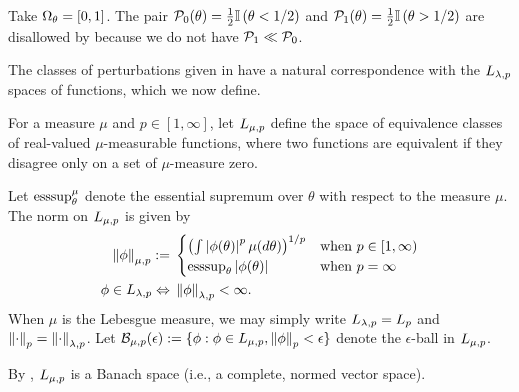 \begin{ex}
%
Take $\Omega_{\theta} = [0,1]$.  The pair $\mathcal{P}_{0}(\theta)  = \frac{1}{2}\mathbb{I}\left(\theta < 1/2\right)$
and $\mathcal{P}_{1}(\theta) = \frac{1}{2} \mathbb{I}\left(\theta > 1/2\right)$ are disallowed
by  because we do not have $\mathcal{P}_{1} \ll \mathcal{P}_{0}$.
%
\end{ex}


The classes of perturbations given in  have a natural
correspondence with the ${L_{\lambda, p}}$ spaces of functions, which we now
define.


\begin{defn}
\citep[Sections 5.1-5.2]{dudley:2018:real}
%
For a measure $\mu$ and $p \in [1, \infty]$, let ${L_{\mu,p}}$ define the
space of equivalence classes of real-valued $\mu$-measurable functions,
where two functions are equivalent if they disagree only on a set of
$\mu$-measure zero.

Let $\operatorname*{\mathrm{esssup}}_\theta^\mu$ denote the essential supremum over $\theta$ with
respect to the measure $\mu$. The norm on ${L_{\mu,p}}$ is given by
%
\begin{align*}
%
\norm{\phi}_{\mu,p} :={}&
\begin{cases}
    \left(\int \abs{\phi(\theta)}^p \mu(d\theta)\right)^{1/p}
    & \textrm{when }p \in [1, \infty)\\
    \esssup_{\theta} \abs{\phi(\theta)}
    & \textrm{when }p = \infty
\end{cases}\\
%
\phi \in \lp{\lambda,p} \Leftrightarrow{}& \norm{\phi}_{\lambda,p} < \infty.
%
\end{align*}
%
When $\mu$ is the Lebesgue measure, we may simply write ${L_{\lambda,p}} =
{L_{p}}$ and $\left\Vert\cdot\right\Vert_{p} = \left\Vert\cdot\right\Vert_{\lambda,p}$.
%
Let $\mathcal{B}_{\mu,p}(\epsilon) := \{\phi: \phi \in {L_{\mu, p}},
\left\Vert\phi\right\Vert_p < \epsilon \}$ denote the $\epsilon$-ball in ${L_{\mu, p}}$.
%
\end{defn}

By \citep[Theorem 5.2.1]{dudley:2018:real}, ${L_{\mu,p}}$ is a Banach
space (i.e., a complete, normed vector space).

